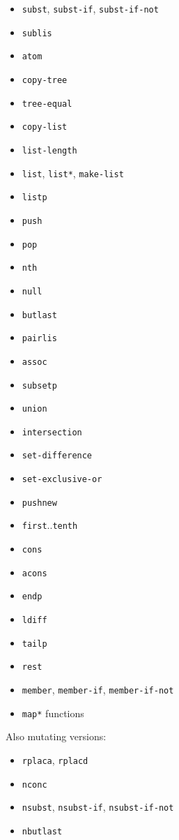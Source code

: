 \documentclass[sigconf]{acmart}
\begin{document}
\begin{itemize}
    \item \texttt{subst}, \texttt{subst-if}, \texttt{subst-if-not}
    \item \texttt{sublis}
    \item \texttt{atom}
    \item \texttt{copy-tree}
    \item \texttt{tree-equal}
    \item \texttt{copy-list}
    \item \texttt{list-length}
    \item \texttt{list}, \texttt{list*}, \texttt{make-list}
    \item \texttt{listp}
    \item \texttt{push}
    \item \texttt{pop}
    \item \texttt{nth}
    \item \texttt{null}
    \item \texttt{butlast}
    \item \texttt{pairlis}
    \item \texttt{assoc}
    \item \texttt{subsetp}
    \item \texttt{union}
    \item \texttt{intersection}
    \item \texttt{set-difference}
    \item \texttt{set-exclusive-or}
    \item \texttt{pushnew}
    \item \texttt{first}..\texttt{tenth}
    \item \texttt{cons}
    \item \texttt{acons}
    \item \texttt{endp}
    \item \texttt{ldiff}
    \item \texttt{tailp}
    \item \texttt{rest}
    \item \texttt{member}, \texttt{member-if}, \texttt{member-if-not}
    \item \texttt{map*} functions
\end{itemize}

Also mutating versions:

\begin{itemize}
    \item \texttt{rplaca}, \texttt{rplacd}
    \item \texttt{nconc}
    \item \texttt{nsubst}, \texttt{nsubst-if}, \texttt{nsubst-if-not}
    \item \texttt{nbutlast}
\end{itemize}
\end{document}
